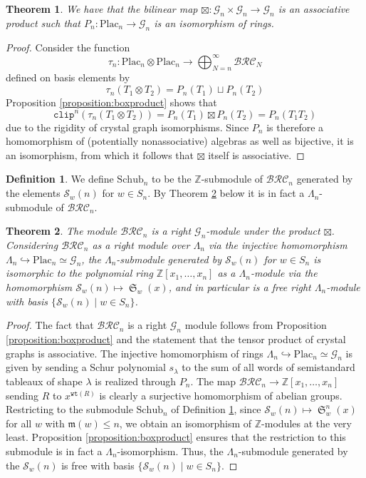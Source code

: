 \documentclass{amsart}
\newtheorem{theorem}{Theorem}[section]
\theoremstyle{definition}
\newtheorem{definition}[lemma]{Definition}
\theoremstyle{remark}
\numberwithin{equation}{subsection}
\DeclareMathOperator{\sch}{\mathfrak{S}}
\newcommand{\wtt}{\mathtt{wt}}
\newcommand{\grass}{\mathcal{G}}
\newcommand{\plac}{\mathrm{Plac}}
\newcommand{\clp}{\mathtt{clip}}
\newcommand{\BRC}{\mathcal{BRC}}
\newcommand{\maxd}{\mathfrak{m}}
\begin{document}
\begin{theorem} \label{theorem:placticiso}
We have that the bilinear map $\boxtimes: \grass_n\times \grass_n\to\grass_n$ is an associative product such that $P_n:\plac_n\to \grass_n$ is an isomorphism of rings.
\end{theorem}
\begin{proof}
Consider the function 
$$\tau_n:\plac_n\otimes \plac_n\to \bigoplus_{N = n}^\infty \BRC_N$$ 
defined on basis elements by
$$\tau_n(T_1\otimes T_2) = P_n(T_1)\sqcup P_n(T_2)$$
Proposition \ref{proposition:boxproduct} shows that
$$\clp^n(\tau_n(T_1\otimes T_2)) = P_n(T_1)\boxtimes P_n(T_2) = P_n(T_1T_2)$$
due to the rigidity of crystal graph isomorphisms. Since $P_n$ is therefore a homomorphism of (potentially nonassociative) algebras as well as bijective, it is an isomorphism, from which it follows that $\boxtimes$ itself is associative.
\end{proof}

\begin{definition}\label{definition:schubn}
We define $\mathrm{Schub}_n$ to be the $\mathbb{Z}$-submodule of $\BRC_n$ generated by the elements $\mathcal{S}_w(n)$ for $w\in S_n$. By Theorem \ref{theorem:schubmoduleiso} below it is in fact a $\Lambda_n$-submodule of $\BRC_n$.
\end{definition}

\begin{theorem} \label{theorem:schubmoduleiso}
  The module $\BRC_n$ is a right $\grass_n$-module under the product $\boxtimes$. Considering $\BRC_n$ as a right module over $\Lambda_n$ via the injective homomorphism $\Lambda_n\hookrightarrow \plac_n\simeq \grass_n$, the $\Lambda_n$-submodule generated by $\mathcal{S}_w(n)$ for $w\in S_n$ is isomorphic to the polynomial ring $\mathbb{Z}[x_1,\ldots,x_n]$ as a $\Lambda_n$-module via the homomorphism $\mathcal{S}_w(n)\mapsto\sch_w(x)$, and in particular is a free right $\Lambda_n$-module with basis $\{\mathcal{S}_w(n)\mid w\in S_n\}$.
\end{theorem}
\begin{proof}
The fact that $\BRC_n$ is a right $\grass_n$ module follows from Proposition \ref{proposition:boxproduct} and the statement that the tensor product of crystal graphs is associative. The injective homomorphism of rings $\Lambda_n\hookrightarrow \plac_n\simeq \grass_n$ is given by sending a Schur polynomial $s_\lambda$ to the sum of all words of semistandard tableaux of shape $\lambda$ is realized through $P_n$. The map $\BRC_n\to \mathbb{Z}[x_1,\ldots,x_n]$ sending $R$ to $x^{\wtt(R)}$ is clearly a surjective homomorphism of abelian groups. Restricting to the submodule $\mathrm{Schub}_n$ of Definition \ref{definition:schubn}, since $\mathcal{S}_w(n)\mapsto \sch_w^n(x)$ for all $w$ with $\maxd(w)\leq n$, we obtain an isomorphism of $\mathbb{Z}$-modules at the very least. Proposition \ref{proposition:boxproduct} ensures that the restriction to this submodule is in fact a $\Lambda_n$-isomorphism. Thus, the $\Lambda_n$-submodule generated by the $\mathcal{S}_w(n)$ is free with basis $\{\mathcal{S}_w(n)\mid w\in S_n\}$.
\end{proof}
\end{document}
